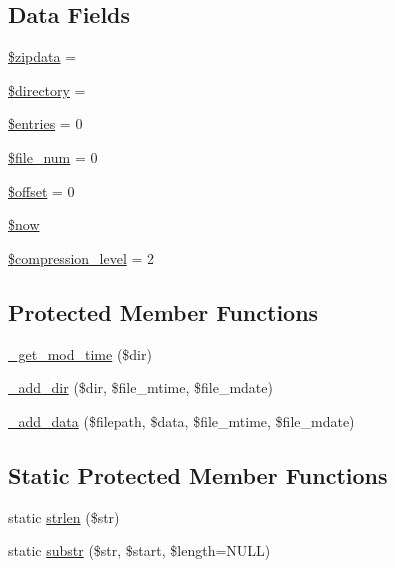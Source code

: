 \subsection*{Data Fields}
\begin{DoxyCompactItemize}
\item 
\mbox{\hyperlink{class_c_i___zip_a395accfd5884d9a0e6fd53470b3e85b1}{\$zipdata}} = \textquotesingle{}\textquotesingle{}
\item 
\mbox{\hyperlink{class_c_i___zip_a1b07c630eb02f770a082a013373a16d6}{\$directory}} = \textquotesingle{}\textquotesingle{}
\item 
\mbox{\hyperlink{class_c_i___zip_affb4200921149b6126d0e51b415b2c75}{\$entries}} = 0
\item 
\mbox{\hyperlink{class_c_i___zip_af1ab53ee1a849492829ce782aac0163d}{\$file\+\_\+num}} = 0
\item 
\mbox{\hyperlink{class_c_i___zip_aec4de82415d7f05cb9748d12d3a95a87}{\$offset}} = 0
\item 
\mbox{\hyperlink{class_c_i___zip_af1d5ccdee975b8f4d20aaffc5b28557c}{\$now}}
\item 
\mbox{\hyperlink{class_c_i___zip_a9a4e30766e452f0d2feaecd666787ca1}{\$compression\+\_\+level}} = 2
\end{DoxyCompactItemize}
\subsection*{Protected Member Functions}
\begin{DoxyCompactItemize}
\item 
\mbox{\hyperlink{class_c_i___zip_a2e4a669b246619934060ea323b99b332}{\+\_\+get\+\_\+mod\+\_\+time}} (\$dir)
\item 
\mbox{\hyperlink{class_c_i___zip_aacd1bc7175638298e01bd6c16bccfbe6}{\+\_\+add\+\_\+dir}} (\$dir, \$file\+\_\+mtime, \$file\+\_\+mdate)
\item 
\mbox{\hyperlink{class_c_i___zip_a4ff8a5ea57979ec1a44cc9e443acf26d}{\+\_\+add\+\_\+data}} (\$filepath, \$data, \$file\+\_\+mtime, \$file\+\_\+mdate)
\end{DoxyCompactItemize}
\subsection*{Static Protected Member Functions}
\begin{DoxyCompactItemize}
\item 
static \mbox{\hyperlink{class_c_i___zip_a4c29a687d4ed62c26a10e41d98930d5f}{strlen}} (\$str)
\item 
static \mbox{\hyperlink{class_c_i___zip_a101caef57ef0b165da5747e2c2e6c9dc}{substr}} (\$str, \$start, \$length=N\+U\+LL)
\end{DoxyCompactItemize}
